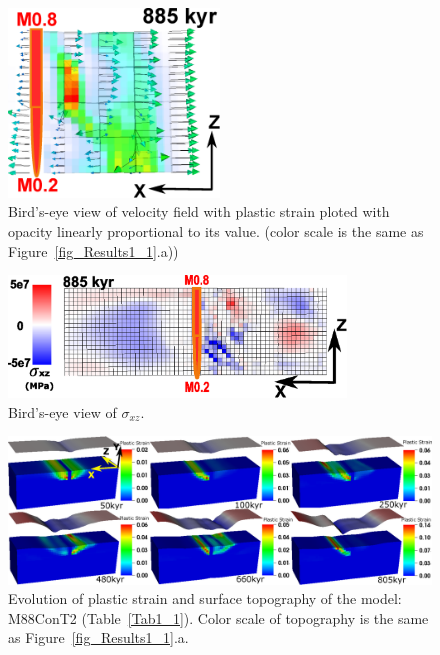 \documentclass[draft,gc]{agutex}
\begin{document}
\begin{figure}[h]
\noindent\includegraphics[width=0.5\textwidth]{./Figures/fig_Results_1_velocity_field.eps}
  \caption[Bird's-eye view of velocity field with plastic strain ploted with opacity linearly proportional to its value.]{Bird's-eye view of velocity field with plastic strain ploted with opacity linearly proportional to its value. (color scale is the same as Figure~\ref{fig_Results1_1}.a))}
 \label{fig_Results_1_velocity_field}
\end{figure}

\begin{figure}[h]
\noindent\includegraphics[width=0.8\textwidth]{./Figures/fig_Results_1_Sxz.eps}
   \caption{Bird's-eye view of $\sigma_{xz}$.}
  \label{fig_Results_1_Sxz}
\end{figure}

\begin{figure}[h]
\noindent\includegraphics[width=1.0\textwidth]{./Figures/fig_Results1_3.eps}
  \caption{Evolution of plastic strain and surface topography of the model: M88ConT2 (Table~\ref{Tab1_1}). Color scale of topography is the same as Figure~\ref{fig_Results1_1}.a.}
 \label{fig_Results1_3}
\end{figure}   
\end{document}
